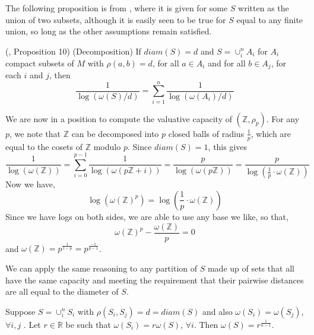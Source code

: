 The following proposition is from \cite{kj}, where it is given for some $S$  written as the union of two subsets, although it is easily seen to be true for $S$ equal to any finite union, so long as the other assumptions remain satisfied.\\  

\begin{proposition}
	(\cite{kj}, Proposition 10) (Decomposition) If  $diam(S)=d$ and $S=\cup_i^n A_i$ for $A_i$ compact subsets of $M$ with $\rho(a, b)=d$, for all $a \in A_i$ and for all $b \in A_j$, for each $i$ and $j$, then \[\frac{1}{\log(\omega(S)/d) } = \sum_{i=1}^n \frac{1}{\log(\omega(A_i)/d)}\] 
\end{proposition}


\begin{example}
We are now in a position to compute the valuative capacity of $(\mathbb{Z}, \rho_p)$. For any $p$, we note that $\mathbb{Z}$ can be decomposed into $p$ closed balls of radius $\frac{1}{p}$, which are equal to the cosets of $\mathbb{Z}$ modulo $p$. Since $diam(S)=1$, this gives 
\[\frac{1}{\log(\omega(\mathbb{Z}))} = \sum_{i=0}^{p-1} \frac{1}{\log(\omega(p\mathbb{Z} +i))} = \frac{p}{\log(\omega(p\mathbb{Z}))} = \frac{p}{\log(\frac{1}{p} \cdot \omega(\mathbb{Z}))}\]
Now we have,
\[\log(\omega(\mathbb{Z})^p) = \log(\frac{1}{p} \cdot\omega(\mathbb{Z}))\]
Since we have logs on both sides, we are able to use any base we like, so that,
\[\omega(\mathbb{Z})^p - \frac{\omega(\mathbb{Z})}{p} = 0 \]
and $\omega(\mathbb{Z})= p^{\frac{1}{1-p}}=p^{\frac{-1}{p-1}}$.
\end{example}

We can apply the same reasoning to any partition of $S$ made up of sets that all have the same capacity and meeting the requirement that their pairwise distances are all equal to the diameter of $S$.\\

\begin{corollary}
\label{semiregular}
	Suppose $S = \cup_i^n S_i$ with $\rho(S_i, S_j)=d=diam(S)$ and also $\omega(S_i)=\omega(S_j)$, $\forall i,j$ .  Let $r \in \mathbb{R}$ be such that $\omega(S_i)=r\omega(S)$, $\forall i$. Then $\omega(S) = r^{\frac{1}{n-1}}$. 
\end{corollary}

